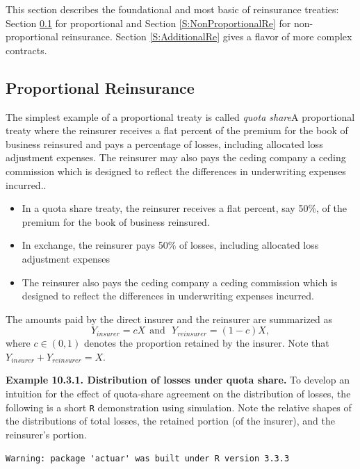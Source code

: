 \documentclass[]{book}
\theoremstyle{definition}
\theoremstyle{definition}
\theoremstyle{definition}
\theoremstyle{remark}
\begin{document}
This section describes the foundational and most basic of reinsurance
treaties: Section \ref{S:ProportionalRe} for proportional and Section
\ref{S:NonProportionalRe} for non-proportional reinsurance. Section
\ref{S:AdditionalRe} gives a flavor of more complex contracts.

\subsection{Proportional Reinsurance}\label{S:ProportionalRe}

The simplest example of a proportional treaty is called \emph{quota
share}{A proportional treaty where the reinsurer receives a flat percent
of the premium for the book of business reinsured and pays a percentage
of losses, including allocated loss adjustment expenses. The reinsurer
may also pays the ceding company a ceding commission which is designed
to reflect the differences in underwriting expenses incurred.}.

\begin{itemize}
\item
  In a quota share treaty, the reinsurer receives a flat percent, say
  50\%, of the premium for the book of business reinsured.
\item
  In exchange, the reinsurer pays 50\% of losses, including allocated
  loss adjustment expenses
\item
  The reinsurer also pays the ceding company a ceding commission which
  is designed to reflect the differences in underwriting expenses
  incurred.
\end{itemize}

The amounts paid by the direct insurer and the reinsurer are summarized
as \[
Y_{insurer} = c X \ \ \text{and} \ \ \ Y_{reinsurer} = (1-c) X,
\] where \(c\in (0,1)\) denotes the proportion retained by the insurer.
Note that \(Y_{insurer}+Y_{reinsurer}=X\).

\textbf{Example 10.3.1. Distribution of losses under quota share.} To
develop an intuition for the effect of quota-share agreement on the
distribution of losses, the following is a short \texttt{R}
demonstration using simulation. Note the relative shapes of the
distributions of total losses, the retained portion (of the insurer),
and the reinsurer's portion.

\begin{verbatim}
Warning: package 'actuar' was built under R version 3.3.3
\end{verbatim}
\end{document}
